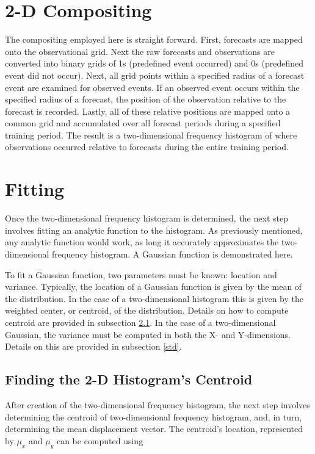 \section{2-D Compositing}
\label{compositing}

The compositing employed here is straight forward.
First, forecasts are mapped onto the observational grid.
Next the raw forecasts and observations are converted into binary grids of 1s (predefined event occurred) and 0s (predefined event did not occur).
Next, all grid points within a specified radius of a forecast event are examined for observed events.
If an observed event occurs within the specified radius of a forecast, the position of the observation relative to the forecast is recorded.
Lastly, all of these relative positions are mapped onto a common grid and accumulated over all forecast periods during a specified training period.
The result is a two-dimensional frequency histogram of where observations occurred relative to forecasts during the entire training period.




\section{Fitting}
\label{fitting}

Once the two-dimensional frequency histogram is determined, the next step involves fitting an analytic function to the histogram.
As previously mentioned, any analytic function would work, as long it accurately approximates the two-dimensional frequency histogram.
A Gaussian function is demonstrated here.


To fit a Gaussian function, two parameters must be known: location and variance.
Typically, the location of a Gaussian function is given by the mean of the distribution.
In the case of a two-dimensional histogram this is given by the weighted center, or centroid, of the distribution.
Details on how to compute centroid are provided in subsection \ref{centroid}.
In the case of a two-dimensional Gaussian, the variance must be computed in both the X- and Y-dimensions.
Details on this are provided in subsection \ref{std}.




\subsection{Finding the 2-D Histogram's Centroid}
\label{centroid}

After creation of the two-dimensional frequency histogram, the next step involves determining the centroid of two-dimensional frequency histogram, and, in turn, determining the mean displacement vector.
The centroid's location, represented by $\mu_x$ and $\mu_y$ can be computed using

